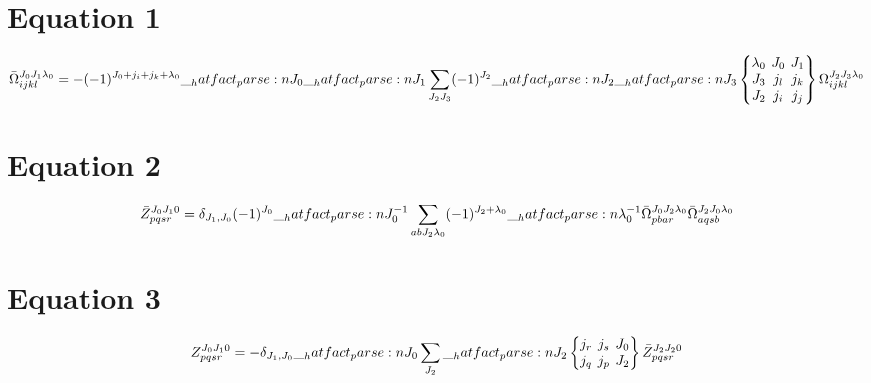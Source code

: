 \documentclass{scrartcl}
\newcommand{\sixj}[6]{\begingroup\setlength{\arraycolsep}{0.2em}\begin{Bmatrix} #1 & #2 & #3 \\ #4 & #5 & #6 \end{Bmatrix}\endgroup}
\newcommand{\ninej}[9]{\begingroup\setlength{\arraycolsep}{0.2em}\begin{Bmatrix} #1 & #2 & #3 \\ #4 & #5 & #6 \\ #7 & #8 & #9 \end{Bmatrix}\endgroup}
\begin{document}
\section{Equation 1}
\begin{dmath*}
\bar{\Omega}_{i j k l}^{{J}_{0} {J}_{1} {{\lambda}}_{0}} = -(-1)^{{J}_{0}+{j}_{i}+{j}_{k}+{{\lambda}}_{0}} \* \hatfact{{J}_{0}} \* \hatfact{{J}_{1}} \* \sum_{{J}_{2} {J}_{3}} \* (-1)^{{J}_{2}} \* \hatfact{{J}_{2}} \* \hatfact{{J}_{3}} \* \ninej{{{\lambda}}_{0}}{{J}_{0}}{{J}_{1}}{{J}_{3}}{{j}_{l}}{{j}_{k}}{{J}_{2}}{{j}_{i}}{{j}_{j}} \* \Omega_{i j k l}^{{J}_{2} {J}_{3} {{\lambda}}_{0}}
\end{dmath*}

\section{Equation 2}
\begin{dmath*}
\bar{Z}_{p q s r}^{{J}_{0} {J}_{1} 0} = \delta_{{J}_{1},{J}_{0}} \* (-1)^{{J}_{0}} \* \hatfact{{J}_{0}^{-1}} \* \sum_{a b {J}_{2} {{\lambda}}_{0}} \* (-1)^{{J}_{2}+{{\lambda}}_{0}} \* \hatfact{{{\lambda}}_{0}^{-1}} \* \bar{\Omega}_{p b a r}^{{J}_{0} {J}_{2} {{\lambda}}_{0}} \* \bar{\Omega}_{a q s b}^{{J}_{2} {J}_{0} {{\lambda}}_{0}}
\end{dmath*}

\section{Equation 3}
\begin{dmath*}
Z_{p q s r}^{{J}_{0} {J}_{1} 0} = -\delta_{{J}_{1},{J}_{0}} \* \hatfact{{J}_{0}} \* \sum_{{J}_{2}} \* \hatfact{{J}_{2}} \* \sixj{{j}_{r}}{{j}_{s}}{{J}_{0}}{{j}_{q}}{{j}_{p}}{{J}_{2}} \* \bar{Z}_{p q s r}^{{J}_{2} {J}_{2} 0}
\end{dmath*}
\end{document}
